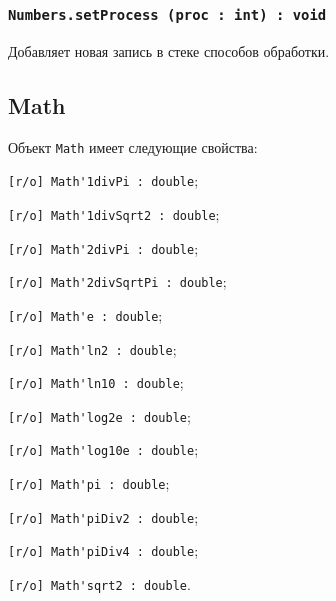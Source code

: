 \subsubsection{\lstinline|Numbers.setProcess (proc : int) : void|}

Добавляет новая запись в стеке способов обработки.

\subsection{{\color{orange} Math}}

Объект \lstinline|Math| имеет следующие свойства:
\begin{icItems}
	\item \lstinline|[r/o] Math'1divPi : double|;
	\item \lstinline|[r/o] Math'1divSqrt2 : double|;
	\item \lstinline|[r/o] Math'2divPi : double|;
	\item \lstinline|[r/o] Math'2divSqrtPi : double|;
	\item \lstinline|[r/o] Math'e : double|;
	\item \lstinline|[r/o] Math'ln2 : double|;
	\item \lstinline|[r/o] Math'ln10 : double|;
	\item \lstinline|[r/o] Math'log2e : double|;
	\item \lstinline|[r/o] Math'log10e : double|;
	\item \lstinline|[r/o] Math'pi : double|;
	\item \lstinline|[r/o] Math'piDiv2 : double|;
	\item \lstinline|[r/o] Math'piDiv4 : double|;
	\item \lstinline|[r/o] Math'sqrt2 : double|.
\end{icItems}

